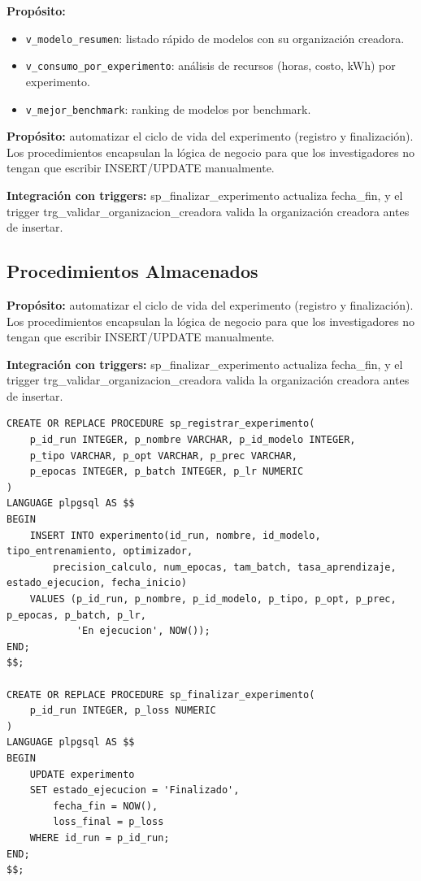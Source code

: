 \documentclass[12pt,a4paper]{article}
\begin{document}
\textbf{Propósito:}
\begin{itemize}
  \item \texttt{v\_modelo\_resumen}: listado rápido de modelos con su organización creadora.
  \item \texttt{v\_consumo\_por\_experimento}: análisis de recursos (horas, costo, kWh) por experimento.
  \item \texttt{v\_mejor\_benchmark}: ranking de modelos por benchmark.
\end{itemize}

\textbf{Propósito:} automatizar el ciclo de vida del experimento (registro y finalización). Los procedimientos encapsulan la lógica de negocio para que los investigadores no tengan que escribir INSERT/UPDATE manualmente.

\textbf{Integración con triggers:} sp_finalizar_experimento actualiza fecha_fin, y el trigger trg_validar_organizacion_creadora valida la organización creadora antes de insertar.

\subsection{Procedimientos Almacenados}

\textbf{Propósito:} automatizar el ciclo de vida del experimento (registro y finalización). Los procedimientos encapsulan la lógica de negocio para que los investigadores no tengan que escribir INSERT/UPDATE manualmente.

\textbf{Integración con triggers:} sp_finalizar_experimento actualiza fecha_fin, y el trigger trg_validar_organizacion_creadora valida la organización creadora antes de insertar.

\begin{lstlisting}
CREATE OR REPLACE PROCEDURE sp_registrar_experimento(
    p_id_run INTEGER, p_nombre VARCHAR, p_id_modelo INTEGER,
    p_tipo VARCHAR, p_opt VARCHAR, p_prec VARCHAR,
    p_epocas INTEGER, p_batch INTEGER, p_lr NUMERIC
)
LANGUAGE plpgsql AS $$
BEGIN
    INSERT INTO experimento(id_run, nombre, id_modelo, tipo_entrenamiento, optimizador,
        precision_calculo, num_epocas, tam_batch, tasa_aprendizaje, estado_ejecucion, fecha_inicio)
    VALUES (p_id_run, p_nombre, p_id_modelo, p_tipo, p_opt, p_prec, p_epocas, p_batch, p_lr,
            'En ejecucion', NOW());
END;
$$;

CREATE OR REPLACE PROCEDURE sp_finalizar_experimento(
    p_id_run INTEGER, p_loss NUMERIC
)
LANGUAGE plpgsql AS $$
BEGIN
    UPDATE experimento
    SET estado_ejecucion = 'Finalizado',
        fecha_fin = NOW(),
        loss_final = p_loss
    WHERE id_run = p_id_run;
END;
$$;
\end{lstlisting}
\end{document}
